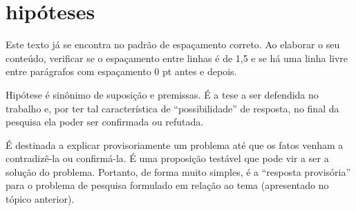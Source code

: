 \section{hipóteses} 
Este texto já se encontra no padrão de espaçamento correto. Ao elaborar o seu conteúdo, verificar se o espaçamento entre linhas é de 1,5 e se há uma linha livre entre parágrafos com espaçamento 0 pt antes e depois. 

Hipótese é sinônimo de suposição e premissas. É a tese a ser defendida no trabalho e, por ter tal característica de “possibilidade” de resposta, no final da pesquisa ela poder ser confirmada ou refutada.  

É destinada a explicar provisoriamente um problema até que os fatos venham a contradizê-la ou confirmá-la. É uma proposição testável que pode vir a ser a solução do problema.\newline
Portanto, de forma muito simples, é a “resposta provisória” para o problema de pesquisa formulado em relação ao tema (apresentado no tópico anterior).   
